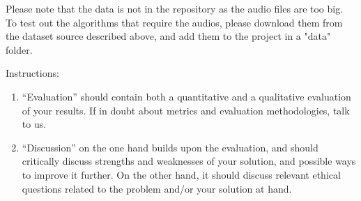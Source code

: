\documentclass[11pt]{article}
\begin{document}
Please note that the data is not in the repository as the audio files are too big. To test out the algorithms that require the audios, please download them from the dataset source described above, and add them to the project in a "data" folder.

% 

%

Instructions: 
\begin{enumerate}
    \item ``Evaluation'' should contain both a quantitative and a qualitative evaluation of your results. If in doubt about metrics and evaluation methodologies, talk to us.
    \item ``Discussion'' on the one hand builds upon the evaluation, and should critically discuss strengths and weaknesses of your solution, and possible ways to improve it further. On the other hand, it should discuss relevant ethical questions related to the problem and/or your solution at hand.
\end{enumerate}
\end{document}
